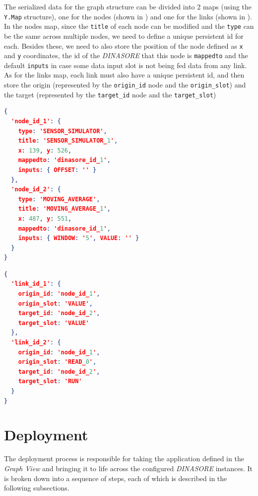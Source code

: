 The serialized data for the graph structure can be divided into 2 maps (using the \texttt{Y.Map} structure), one for the nodes (shown in ) and one for the links (shown in ). In the nodes map, since the \texttt{title} of each node can be modified and the \texttt{type} can be the same across multiple nodes, we need to define a unique persistent id for each. Besides these, we need to also store the position of the node defined as \texttt{x} and \texttt{y} coordinates, the id of the \textit{DINASORE} that this node is \texttt{mappedto} and the default \texttt{inputs} in case some data input slot is not being fed data from any link. As for the links map, each link must also have a unique persistent id, and then store the origin (represented by the \texttt{origin\_id} node and the \texttt{origin\_slot}) and the target (represented by the \texttt{target\_id} node and the \texttt{target\_slot})

\begin{lstlisting}[language=JSON, caption={Structure of the Nodes serialized map}, label={lst:serialize-nodes}]
{
  'node_id_1': {
    type: 'SENSOR_SIMULATOR',
    title: 'SENSOR_SIMULATOR_1',
    x: 139, y: 526,
    mappedto: 'dinasore_id_1',
    inputs: { OFFSET: '' }
  },
  'node_id_2': {
    type: 'MOVING_AVERAGE',
    title: 'MOVING_AVERAGE_1',
    x: 487, y: 551,
    mappedto: 'dinasore_id_1',
    inputs: { WINDOW: '5', VALUE: '' }
  }
}
\end{lstlisting}

\begin{lstlisting}[language=JSON, caption={Structure of the Links serialized map}, label={lst:serialize-links}]
{
  'link_id_1': {
    origin_id: 'node_id_1',
    origin_slot: 'VALUE',
    target_id: 'node_id_2',
    target_slot: 'VALUE'
  },
  'link_id_2': {
    origin_id: 'node_id_1',
    origin_slot: 'READ_0',
    target_id: 'node_id_2',
    target_slot: 'RUN'
  }
}
\end{lstlisting}


\section{Deployment} \label{sec:deployment}
The deployment process is responsible for taking the application defined in the \textit{Graph View} and bringing it to life across the configured \textit{DINASORE} instances. It is broken down into a sequence of steps, each of which is described in the following subsections.

